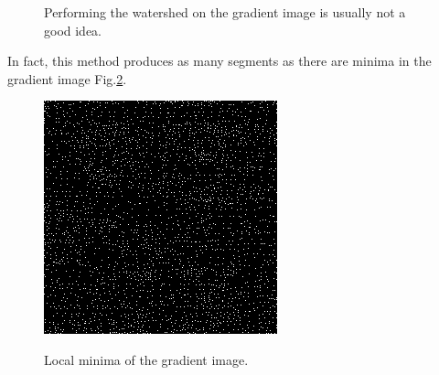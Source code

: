 \vspace*{-8pt}

\begin{figure}[H]
 \centering\caption{Performing the watershed on the gradient image is usually not a good idea.}%
 \hfill
 \hfill
  \vspace*{-10pt}%
 \label{fig:watershed:python:wat}%
\end{figure}

\vspace*{-10pt}

In fact, this method produces as many segments as there are minima in the gradient image Fig.\ref{fig:watershed:python:minima}.

\vspace*{-8pt}

\begin{figure}[H]
\centering\caption{Local minima of the gradient image.}%
\includegraphics[width=.25\linewidth]{markers_gel.python.png}%
 \label{fig:watershed:python:minima}%
\end{figure}

